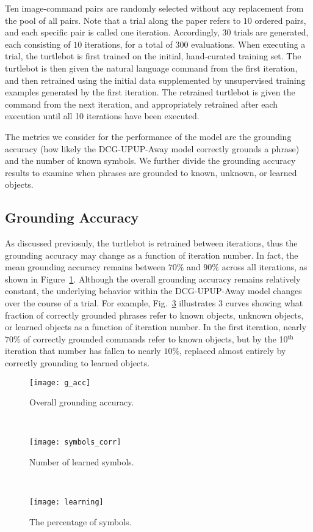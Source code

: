 Ten image-command pairs are randomly selected without any replacement from the pool of all pairs.
Note that a trial along the paper refers to $10$ ordered pairs, and each specific pair is called one iteration.
Accordingly, $30$ trials are generated, each consisting of $10$ iterations, for a total of $300$ evaluations.
When executing a trial, the turtlebot is first trained on the initial, hand-curated training set.
The turtlebot is then given the natural language command from the first iteration, and then retrained using the initial data supplemented by unsupervised training examples generated by the first iteration.
The retrained turtlebot is given the command from the next iteration, and appropriately retrained after each execution until all 10 iterations have been executed.

The metrics we consider for the performance of the model are the grounding accuracy (how likely the DCG-UPUP-Away model correctly grounds a phrase) and the number of known symbols.
We further divide the grounding accuracy results to examine when phrases are grounded to known, unknown, or learned objects.
\subsection{Grounding Accuracy}
As discussed previosuly, the turtlebot is retrained between iterations, thus the grounding accuracy may change as a function of iteration number. In fact, the mean grounding accuracy remains between $70\%$ and $90\%$ across all iterations, as shown in Figure~\ref{fig:g_acc}. Although the overall grounding accuracy remains relatively constant, the underlying behavior within the DCG-UPUP-Away model changes over the course of a trial. For example, Fig.~\ref{fig:g_acc_split} illustrates 3 curves showing what fraction of correctly grounded phrases refer to known objects, unknown objects, or learned objects as a function of iteration number. In the first iteration, nearly $70\%$ of correctly grounded commands refer to known objects, but by the 10$^\text{th}$ iteration that number has fallen to nearly $10\%$, replaced almost entirely by correctly grounding to learned objects.

\begin{figure*}
\begin{subfigure}[b]{0.3\textwidth}
\centering
\texttt{[image: g\_acc]}
\caption{Overall grounding accuracy.}
\label{fig:g_acc}
\end{subfigure}
~
\begin{subfigure}[b]{0.31\textwidth}
\centering
\texttt{[image: symbols\_corr]}
\caption{Number of learned symbols.}
\label{fig:symbols}
\end{subfigure}
~
\begin{subfigure}[b]{0.33\textwidth}
\centering
\texttt{[image: learning]}
\caption{The percentage of symbols.}
\label{fig:g_acc_split}
\end{subfigure}
\caption{The performance results of the simulation study.}
\end{figure*}

